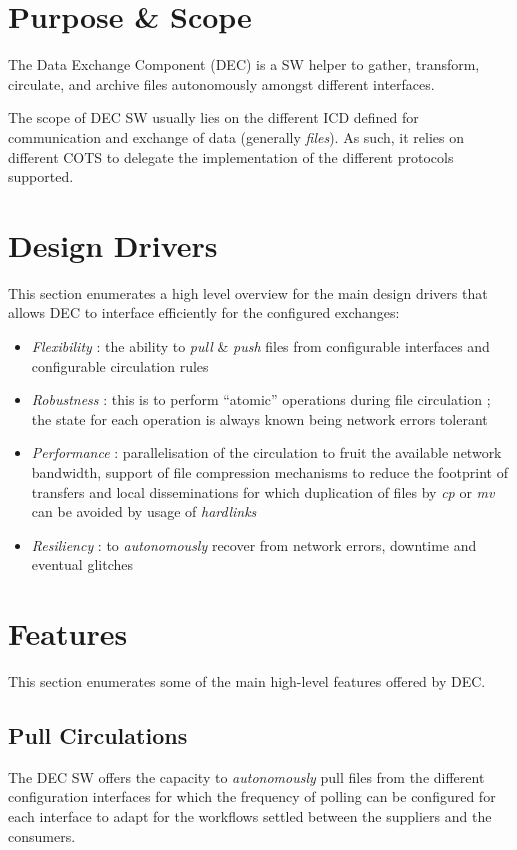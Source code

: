 \documentclass[dec_sum_main.tex]{subfiles}
\begin{document}
\section{Purpose \& Scope}
The Data Exchange Component (DEC) is a SW helper to gather, transform, circulate, and archive files autonomously amongst different interfaces. \newline
\par
\noindent
The scope of DEC SW usually lies on the different ICD defined for communication and exchange of data (generally \textit{files}). As such, it relies on different COTS to delegate the implementation of the different protocols supported.

\section{Design Drivers}
This section enumerates a high level overview for the main design drivers that allows DEC to interface efficiently for the configured exchanges:

\begin{itemize}
	\item \textit{Flexibility} : the ability to \textit{pull} \& \textit{push} files from configurable interfaces and configurable circulation rules
	\item \textit{Robustness} : this is to perform “atomic” operations during file circulation ; the state for each operation is always known being network errors tolerant
	\item \textit{Performance} : parallelisation of the circulation to fruit the available network bandwidth, support of file compression mechanisms to reduce the footprint of transfers and local disseminations for which duplication of files by \textit{cp} or \textit{mv} can be avoided by usage of \textit{hardlinks}
	\item \textit{Resiliency} : to \textit{autonomously} recover from network errors, downtime and eventual glitches
\end{itemize}

\section{Features}
This section enumerates some of the main high-level features offered by DEC.

\subsection{Pull Circulations}
The DEC SW offers the capacity to \textit{autonomously} pull files from the different configuration interfaces for which the frequency of polling can be configured for each interface to adapt for the workflows settled between the suppliers and the consumers.
\par
\noindent
\end{document}
